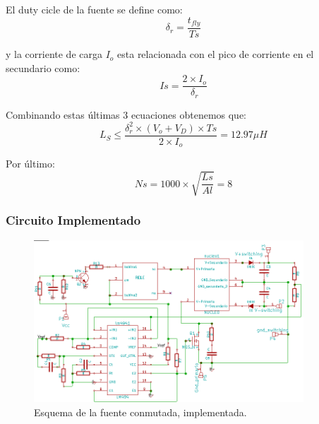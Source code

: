 El duty cicle de la fuente se define como:
$$
\delta_r= \frac{t_{fly}}{Ts}
$$

y la corriente de carga $I_o$ esta relacionada con el pico de corriente en el secundario
como:
$$
Is=\frac{2 \times I_o }{\delta_r}
$$

Combinando estas últimas 3 ecuaciones obtenemos que:
$$
L_S \leq \frac{\delta_r^2 \times (V_o + V_D) \times Ts}{2 \times I_o} =12.97\mu H
$$

Por último:
$$
Ns= 1000 \times \sqrt{\frac{Ls}{Al}}=8
$$
\medskip
\subsubsection{Circuito Implementado}
\begin{figure}[H]
\centering
\includegraphics[width=0.90\textwidth]{img/cir_conmutada.png}
\caption{Esquema  de la fuente conmutada, implementada.}
\label{conmutada_cir}
\end{figure}

\medskip
